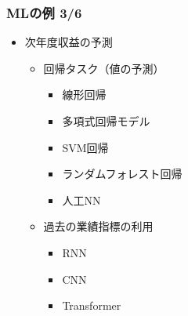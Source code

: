 \documentclass[aspectratio=169, dvipdfmx, 14pt, xcolor={svgnames,dvipsnames}]{beamer}
\def\tightlist{\itemsep1pt\parskip0pt\parsep0pt}
\begin{document}
\begin{frame}
  \frametitle{MLの例 3/6}
  \begin{itemize}
    \item
          次年度収益の予測

          \begin{itemize}
            \tightlist
            \item
                  回帰タスク（値の予測）

                  \begin{itemize}
                    \tightlist
                    \item
                          線形回帰
                    \item
                          多項式回帰モデル
                    \item
                          SVM回帰
                    \item
                          ランダムフォレスト回帰
                    \item
                          人工NN
                  \end{itemize}
            \item
                  過去の業績指標の利用

                  \begin{itemize}
                    \tightlist
                    \item
                          RNN
                    \item
                          CNN
                    \item
                          Transformer
                  \end{itemize}
          \end{itemize}
  \end{itemize}
\end{frame}

\end{document}
